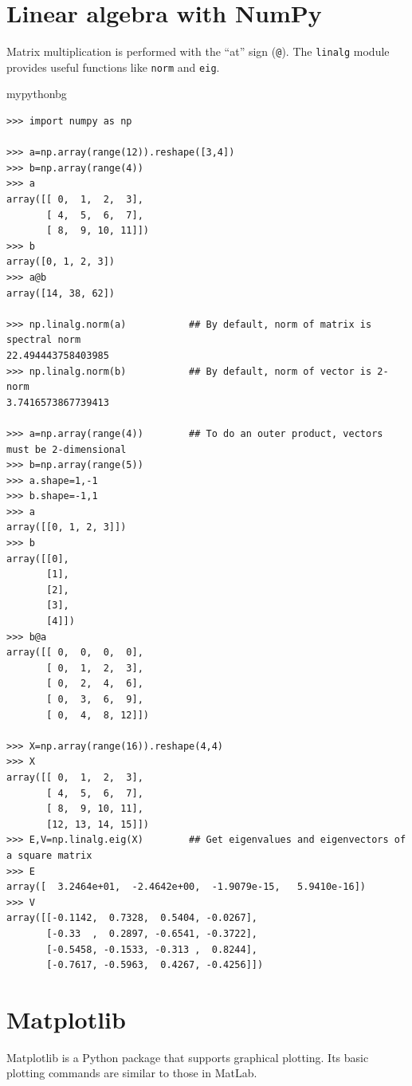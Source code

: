 \section{Linear algebra with NumPy}
Matrix multiplication is performed with the ``at'' sign (\texttt{@}).
The \texttt{linalg} module provides useful functions like \texttt{norm} and \texttt{eig}.
\begin{tsession}{mypythonbg}
\begin{verbatim}
>>> import numpy as np

>>> a=np.array(range(12)).reshape([3,4])
>>> b=np.array(range(4))
>>> a
array([[ 0,  1,  2,  3],
       [ 4,  5,  6,  7],
       [ 8,  9, 10, 11]])
>>> b
array([0, 1, 2, 3])
>>> a@b
array([14, 38, 62])

>>> np.linalg.norm(a)           ## By default, norm of matrix is spectral norm
22.494443758403985
>>> np.linalg.norm(b)           ## By default, norm of vector is 2-norm
3.7416573867739413

>>> a=np.array(range(4))        ## To do an outer product, vectors must be 2-dimensional
>>> b=np.array(range(5))
>>> a.shape=1,-1
>>> b.shape=-1,1
>>> a
array([[0, 1, 2, 3]])
>>> b
array([[0],
       [1],
       [2],
       [3],
       [4]])
>>> b@a
array([[ 0,  0,  0,  0],
       [ 0,  1,  2,  3],
       [ 0,  2,  4,  6],
       [ 0,  3,  6,  9],
       [ 0,  4,  8, 12]])

>>> X=np.array(range(16)).reshape(4,4)
>>> X
array([[ 0,  1,  2,  3],
       [ 4,  5,  6,  7],
       [ 8,  9, 10, 11],
       [12, 13, 14, 15]])
>>> E,V=np.linalg.eig(X)        ## Get eigenvalues and eigenvectors of a square matrix
>>> E
array([  3.2464e+01,  -2.4642e+00,  -1.9079e-15,   5.9410e-16])
>>> V
array([[-0.1142,  0.7328,  0.5404, -0.0267],
       [-0.33  ,  0.2897, -0.6541, -0.3722],
       [-0.5458, -0.1533, -0.313 ,  0.8244],
       [-0.7617, -0.5963,  0.4267, -0.4256]])
\end{verbatim}
\end{tsession}

\section{Matplotlib}
Matplotlib is a Python package that supports graphical plotting.
Its basic plotting commands are similar to those in MatLab.

